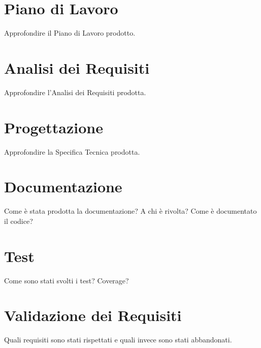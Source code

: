 \section{Piano di Lavoro}

Approfondire il Piano di Lavoro prodotto.

\section{Analisi dei Requisiti}

Approfondire l'Analisi dei Requisiti prodotta.

\section{Progettazione}

Approfondire la Specifica Tecnica prodotta.


\section{Documentazione}

Come è stata prodotta la documentazione? A chi è rivolta? Come è documentato il codice?

\section{Test}

Come sono stati svolti i test? Coverage?


\section{Validazione dei Requisiti}

Quali requisiti sono stati rispettati e quali invece sono stati abbandonati.
